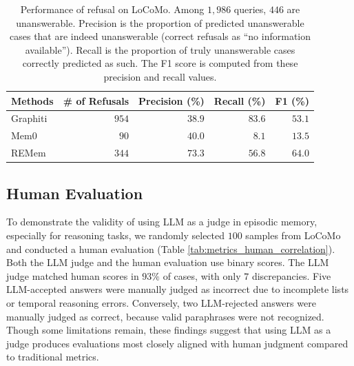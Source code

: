\documentclass{article} %
\newcommand{\ours}{REMem\xspace}
\begin{document}
\begin{table}[tb]
\centering
\small
\caption{Performance of refusal on LoCoMo.
Among $1,986$ queries, $446$ are unanswerable. 
Precision is the proportion of predicted unanswerable cases that are indeed unanswerable (correct refusals as ``no information available''). 
Recall is the proportion of truly unanswerable cases correctly predicted as such. 
The F1 score is computed from these precision and recall values.}
\vspace{0.2em}
\label{tab:unanswerable-detection}
\begin{tabular}{l|rrrr}
\toprule
Methods & \# of Refusals & Precision (\%) & Recall (\%) & F1 (\%) \\
\midrule
Graphiti & $954$  & $38.9$ & $\mathbf{83.6}$ & $53.1$ \\
Mem0     &  $90$  & $40.0$ &  $8.1$ & $13.5$ \\
\ours                  & $344$  & $\mathbf{73.3}$ & $56.8$ & $\mathbf{64.0}$ \\
\bottomrule
\end{tabular}
\end{table}




\subsection{Human Evaluation}

To demonstrate the validity of using LLM as a judge in episodic memory, especially for reasoning tasks, we randomly selected $100$ samples from LoCoMo and conducted a human evaluation (Table \ref{tab:metrics_human_correlation}).
Both the LLM judge and the human evaluation use binary scores.
The LLM judge matched human scores in $93\%$ of cases, with only $7$ discrepancies.
Five LLM-accepted answers were manually judged as incorrect due to incomplete lists or temporal reasoning errors. Conversely, two LLM-rejected answers were manually judged as correct, because valid paraphrases were not recognized.
Though some limitations remain, these findings suggest that using LLM as a judge produces evaluations most closely aligned with human judgment compared to traditional metrics. 
\end{document}
